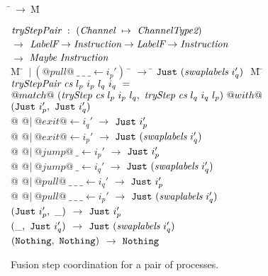\begin{figure}
\begin{tabbing}
\=$~\to~$\=M\kill

$\textit{tryStepPair} ~:~ (\textit{Channel} ~\mapsto~ \textit{ChannelType2})$ \\
\> $\to$ \> $\textit{LabelF} \to \textit{Instruction} \to \textit{LabelF} \to \textit{Instruction}$ \\
\> $\to$ \> $\textit{Maybe}~\textit{Instruction}$ \\

M \= $~|~(@pull@~\_~\_~\_ \gets i_p')~$ \= $\to$ \= $\texttt{Just}~ (\textit{swaplabels}~i_q')~$ \= M \=\kill
$\textit{tryStepPair} ~\textit{cs}~l_p~i_p~l_q~i_q~=$ \\
\> $@match@~ (\textit{tryStep}~\textit{cs}~l_p~i_p~l_q,~\textit{tryStep}~\textit{cs}~l_q~i_q~l_p) ~@with@$ \\
\> $(\texttt{Just}~ i_p',~\texttt{Just}~ i_q')$ \\

\> @ @$|~@exit@ \gets i_q'$ \> $\to$ \> $\texttt{Just}~ i_p'$
\>  \\[0.5ex]

\> @ @$|~@exit@ \gets i_p'$ \> $\to$ \> $\texttt{Just}~ (\textit{swaplabels}~i_q')$
\>  \\[0.5ex]

\> @ @$|~@jump@~\_ \gets i_p'$ \> $\to$ \> $\texttt{Just}~ i_p'$
\>  \\[0.5ex]

\> @ @$|~@jump@~\_ \gets i_q'$ \> $\to$ \> $\texttt{Just}~ (\textit{swaplabels}~i_q')$
\>  \\[0.5ex]

\> @ @$|~@pull@~\_~\_~\_ \gets i_q'$ \> $\to$ \> $\texttt{Just}~ i_p'$
\>  \\[0.5ex]

\> @ @$|~@pull@~\_~\_~\_ \gets i_p'$ \> $\to$ \> $\texttt{Just}~ (\textit{swaplabels}~i_q')$
\>  \\[0.5ex]

\> $(\texttt{Just}~ i_p',~\_)$ \> $\to$ \> $\texttt{Just}~ i_p'$
\>  \\[0.5ex]

\> $(\_, ~\texttt{Just}~ i_q')$ \> $\to$ \> $\texttt{Just}~ (\textit{swaplabels}~i_q')$
\>  \\[0.5ex]

\> $(\texttt{Nothing}, ~\texttt{Nothing})$ \> $\to$ \> $\texttt{Nothing}$
\> 
\end{tabbing}
\caption{Fusion step coordination for a pair of processes.}
\label{fig:Finite:tryStepPair}
\end{figure}


